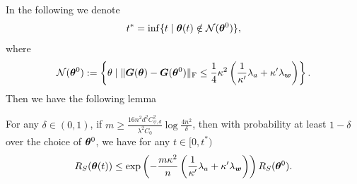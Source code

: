 \documentclass{article}
\begin{document}
\noindent In the following we denote
\begin{equation}
    t^* = \inf\{t \mid \bm{\theta}(t)\notin \mathcal{N}(\bm{\theta}^0)\},
\end{equation}
where
\begin{equation}
    \mathcal{N}(\bm{\theta}^0) := \left\{\theta \mid \lVert\bm{G}(\bm{\theta}) - \bm{G}(\bm{\theta}^0)\rVert_\mathrm{F}\leq \frac{1}{4}\kappa^2\left(\frac{1}{\kappa'}\lambda_a+\kappa'\lambda_{\bm{w}}\right)\right\}.
\end{equation}
Then we have the following lemma
\begin{lem}\label{lem:exp_RS}
    For any $\delta\in(0,1)$, if $m\geq\frac{16n^2d^2C_{\psi,d}^2}{\lambda^2C_0}\log\frac{4n^2}{\delta}$, then with probability at least $1-\delta$ over the choice of $\bm{\theta}^0$, we have for any $t\in[0, t^*)$
    \begin{equation}
        R_S(\bm{\theta}(t)) \leq \exp\left(-\frac{m\kappa^2}{n}\left(\frac{1}{\kappa'}\lambda_a+\kappa'\lambda_{\bm{w}}\right)\right)R_S(\bm{\theta}^0).
    \end{equation}
\end{lem}
\end{document}
